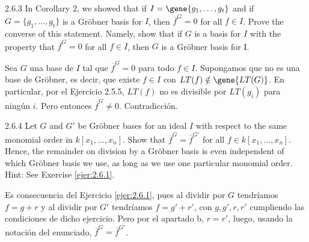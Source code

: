 \documentclass[twoside]{article}
\begin{document}
\begin{ejercicio}{2.6.3}
In Corollary 2, we showed that if $I =\gene{ 
g_1,\dots , g_t}$ and if $G = \{g_1,\dots , g_t\}$ is a Gröbner
basis for $I$, then $\overline{f}^G = 0$ for all $f ∈ I$. Prove the converse of this statement. Namely, show
that if $G$ is a basis for $I$ with the property that $\overline{f}^G = 0$ for all $f ∈ I$, then $G$ is a Gröbner
basis for I.

\end{ejercicio}
\begin{solucion}
Sea $G$ una base de $I$ tal que $\overline{f}^G=0$ para todo $f\in I$. Supongamos que no es una base de Gröbner, es decir, que existe $f\in I$ con $LT(f)\notin \gene{LT(G)}$. En particular, por el Ejercicio 2.5.5, $LT(f)$ no es divisible por $LT(g_i)$ para ningún $i$. Pero entonces $\overline{f}^G \neq 0$. Contradicción.
\end{solucion}

\newpage

\begin{ejercicio}{2.6.4}
Let $G$ and $G'$ be Gröbner bases for an ideal $I$ with respect to the same monomial order
in $k[x_1,\dots , x_n]$. Show that $\overline{f}^G = \overline{f}^{G'}$
for all $f ∈ k[x_1,\dots , x_n]$. Hence, the remainder on
division by a Gröbner basis is even independent of which Gröbner basis we use, as long
as we use one particular monomial order. Hint: See Exercise \ref{ejer:2.6.1}.
\end{ejercicio}
\begin{solucion}
Es consecuencia del Ejercicio \ref{ejer:2.6.1}, pues al dividir por $G$ tendríamos $f=g+r$ y al dividir por $G'$ tendríamos $f=g'+r'$, con $g,g',r,r'$ cumpliendo las condiciones de dicho ejercicio. Pero por el apartado b, $r=r'$, luego, usando la notación del enunciado, $\overline{f}^G = \overline{f}^{G'}$.
\end{solucion}
\newpage
\end{document}
